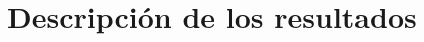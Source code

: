 \documentclass[12pt,letterpaper,spanish,twoside,openright]{report}
\begin{document}
\section{Descripción de los resultados}

\end{document}
